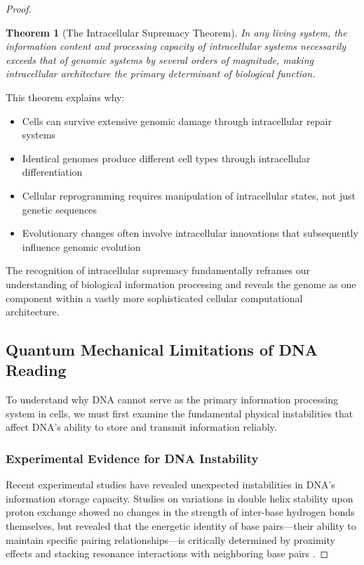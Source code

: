 \documentclass[12pt,a4paper]{article}
\newtheorem{theorem}{Theorem}[section]
\begin{document}
\begin{proof}
\begin{theorem}[The Intracellular Supremacy Theorem]
In any living system, the information content and processing capacity of intracellular systems necessarily exceeds that of genomic systems by several orders of magnitude, making intracellular architecture the primary determinant of biological function.
\end{theorem}

This theorem explains why:
\begin{itemize}
\item Cells can survive extensive genomic damage through intracellular repair systems
\item Identical genomes produce different cell types through intracellular differentiation
\item Cellular reprogramming requires manipulation of intracellular states, not just genetic sequences
\item Evolutionary changes often involve intracellular innovations that subsequently influence genomic evolution
\end{itemize}

The recognition of intracellular supremacy fundamentally reframes our understanding of biological information processing and reveals the genome as one component within a vastly more sophisticated cellular computational architecture.


\subsection{Quantum Mechanical Limitations of DNA Reading}

To understand why DNA cannot serve as the primary information processing system in cells, we must first examine the fundamental physical instabilities that affect DNA's ability to store and transmit information reliably.

\subsubsection{Experimental Evidence for DNA Instability}

Recent experimental studies have revealed unexpected instabilities in DNA's information storage capacity. Studies on variations in double helix stability upon proton exchange showed no changes in the strength of inter-base hydrogen bonds themselves, but revealed that the energetic identity of base pairs—their ability to maintain specific pairing relationships—is critically determined by proximity effects and stacking resonance interactions with neighboring base pairs \cite{schulten1999biomolecular}.


\end{proof}
\end{document}
